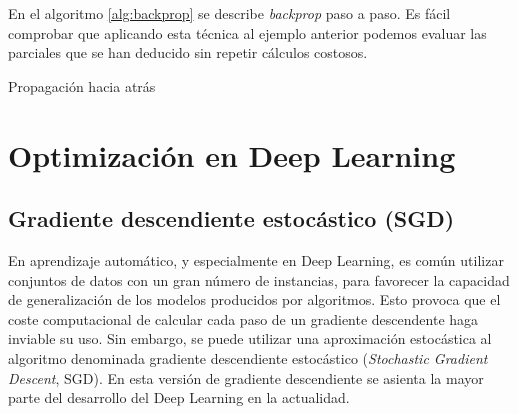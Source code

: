 En el algoritmo \ref{alg:backprop} se describe \emph{backprop} paso a
paso. Es fácil comprobar que aplicando esta técnica al ejemplo anterior
podemos evaluar las parciales que se han deducido sin repetir cálculos
costosos.

\begin{algorithm}
\caption{Propagación hacia atrás}
\label{alg:backprop}
\begin{algorithmic}
  \ENDFOR
\end{algorithmic}
\end{algorithm}

\section{Optimización en Deep
Learning}\label{optimizaciuxf3n-en-deep-learning}

\label{sec:dl-opt}

\subsection{Gradiente descendiente estocástico
(SGD)}\label{gradiente-descendiente-estocuxe1stico-sgd}\label{sec:sgd}

En aprendizaje automático, y especialmente en Deep Learning, es común
utilizar conjuntos de datos con un gran número de instancias, para
favorecer la capacidad de generalización de los modelos producidos por
algoritmos. Esto provoca que el coste computacional de calcular cada
paso de un gradiente descendente haga inviable su uso. Sin embargo, se
puede utilizar una aproximación estocástica al algoritmo denominada
gradiente descendiente estocástico (\emph{Stochastic Gradient Descent},
SGD). En esta versión de gradiente descendiente se asienta la mayor
parte del desarrollo del Deep Learning en la actualidad.

